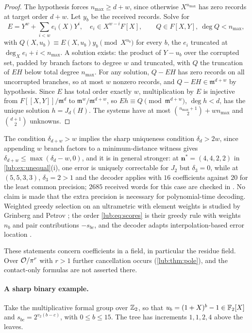 \begin{proof}
The hypothesis forces $n_{\max}\ge d+w$, since otherwise $X^{n_{\max}}$ has zero records at target order
$d+w$. Let $y_b$ be the received records. Solve for
\[
 E=Y^w+\sum_{i<w}e_i(X)Y^i,\quad e_i\in X^{w-i}F[X],\qquad Q\in F[X,Y],\ \deg Q<n_{\max},
\]
with $Q(X,u_b)\equiv E(X,u_b)y_b\pmod{X^{n_b}}$ for every $b$, the $e_i$ truncated at
$\deg_Xe_i+i<n_{\max}$. A solution exists: the product of $Y-u_b$ over the corrupted set, padded by
branch factors to degree $w$ and truncated, with $Q$ the truncation of $EH$ below total degree
$n_{\max}$. For any solution, $Q-EH$ has zero records on all uncorrupted branches, so at most $w$ nonzero
records, and $Q-EH\in\mathfrak m^{d+w}$ by hypothesis. Since $E$ has total order exactly $w$,
multiplication by $E$ is injective from $F[[X,Y]]/\mathfrak m^d$ to $\mathfrak m^w/\mathfrak m^{d+w}$, so
$Eh\equiv Q\pmod{\mathfrak m^{d+w}}$, $\deg h<d$, has the unique solution $h=J_d(H)$. The systems have at
most $\binom{n_{\max}+1}2+wn_{\max}$ and $\binom{d+1}2$ unknowns.
\end{proof}

The condition $\delta_{d+w}>w$ implies the sharp uniqueness condition $\delta_d>2w$, since appending $w$
branch factors to a minimum-distance witness gives $\delta_{d+w}\le\max(\delta_d-w,0)$, and it is in
general stronger: at $\mathbf n^*=(4,4,2,2)$ in \cref{lub:ex:unequal}(i), one error is uniquely
correctable for $J_2$ but $\delta_3=0$, while at $(5,5,3,3)$, $\delta_3=2>1$ and the decoder applies with
$16$ coefficients against $20$ for the least common precision; $2685$ received words for this case are
checked in . No claim is made that the
extra precision is necessary for polynomial-time decoding. Weighted greedy selection on an ultrametric
with element weights is studied by Grinberg and Petrov \cite{GrinbergPetrov2021Greedoid}; the order
\eqref{lub:eq:scores} is their greedy rule with weights $n_b$ and pair contributions $-s_{bc}$, and the
decoder adapts interpolation-based error location \cite{GaoNewAlgorithm}.

These statements concern coefficients in a field, in particular the residue field. Over
$\mathcal{O}/\pi^r$ with $r>1$ further cancellation occurs (\cref{lub:thm:pole}), and the
contact-only formulas are not asserted there.

\paragraph{A sharp binary example.}
Take the multiplicative formal group over $\mathbb{Z}_2$, so that $u_b=(1+X)^b-1\in\mathbb{F}_2[X]$ and
$s_{bc}=2^{v_2(b-c)}$, with $0\le b\le15$. The tree has increments $1,1,2,4$ above the
leaves.

